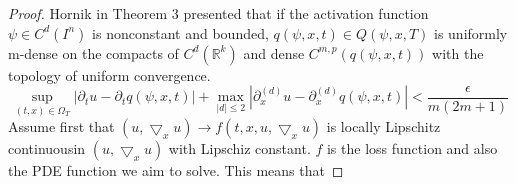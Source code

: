 \documentclass{article}
\begin{document}
\begin{proof}
	Hornik in Theorem 3 \cite{hornik} presented that if the activation function $\psi \in C^{d}(I^{n})$ is nonconstant and bounded, $q(\psi,x,t) \in Q(\psi,x,T)$ is uniformly m-dense on the compacts of $C^{d}(\mathbb{R}^{k})$ and dense $C^{m,p}(q(\psi,x,t))$ with the topology of uniform convergence.
	\begin{equation}
	\sup_{(t,x) \in \Omega_{T}} \left|\partial_{t} u- \partial_{t} q(\psi,x,t)\right| + \max_{|d| \leq 2} \left|\partial_{x}^{(d)} u- \partial_{x}^{(d)} q(\psi,x,t)\right| < \frac{\epsilon}{m(2m+1)}
	\end{equation}
	Assume first that $(u,\bigtriangledown_{x}u) \rightarrow f(t,x,u,\bigtriangledown_{x}u)$ is locally Lipschitz continuous\footnotemark  in $(u,\bigtriangledown_{x}u)$ with Lipschiz constant.
	$f$ is the loss function and also the PDE function we aim to solve. This means that
	

\end{proof}
\end{document}
